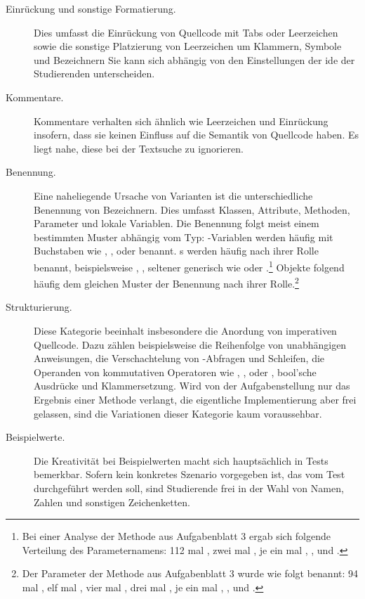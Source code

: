 \begin{description}
    \item[Einrückung und sonstige Formatierung.]
    Dies umfasst die Einrückung von Quellcode mit Tabs oder Leerzeichen sowie die sonstige Platzierung von Leerzeichen um Klammern, Symbole und Bezeichnern
    Sie kann sich abhängig von den Einstellungen der \ac{ide} der Studierenden unterscheiden.
    \item[Kommentare.]
    Kommentare verhalten sich ähnlich wie Leerzeichen und Einrückung insofern, dass sie keinen Einfluss auf die Semantik von Quellcode haben.
    Es liegt nahe, diese bei der Textsuche zu ignorieren.
    \item[Benennung.]
    Eine naheliegende Ursache von Varianten ist die unterschiedliche Benennung von Bezeichnern.
    Dies umfasst Klassen, Attribute, Methoden, Parameter und lokale Variablen.
    Die Benennung folgt meist einem bestimmten Muster abhängig vom Typ:
    -Variablen werden häufig mit Buchstaben wie , ,  oder  benannt.
    s werden häufig nach ihrer Rolle benannt, beispielsweise , , seltener generisch wie  oder .\footnote{
        Bei einer Analyse der Methode  aus Aufgabenblatt 3 ergab sich folgende Verteilung des Parameternamens:
        112 mal , zwei mal , je ein mal , \sic,  und .\label{fn:setPhase}
    }
    Objekte folgend häufig dem gleichen Muster der Benennung nach ihrer Rolle.\footnote{
        Der Parameter der Methode  aus Aufgabenblatt 3 wurde wie folgt benannt:
        94 mal , elf mal , vier mal , drei mal , je ein mal , , \sic und .\label{fn:setWinner}
    }
    \item[Strukturierung.]
    Diese Kategorie beeinhalt insbesondere die Anordung von imperativen Quellcode.
    Dazu zählen beispielsweise die Reihenfolge von unabhängigen Anweisungen, die Verschachtelung von -Abfragen und Schleifen, die Operanden von kommutativen Operatoren wie \code{+}, \code{*}, \code{&&} oder \code{||}, bool'sche Ausdrücke und Klammersetzung.
    Wird von der Aufgabenstellung nur das Ergebnis einer Methode verlangt, die eigentliche Implementierung aber frei gelassen, sind die Variationen dieser Kategorie kaum voraussehbar.
    \item[Beispielwerte.]
    Die Kreativität bei Beispielwerten macht sich hauptsächlich in Tests bemerkbar.
    Sofern kein konkretes Szenario vorgegeben ist, das vom Test durchgeführt werden soll, sind Studierende frei in der Wahl von Namen, Zahlen und sonstigen Zeichenketten.
\end{description}

